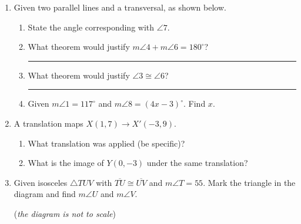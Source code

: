 \documentclass[12pt, twoside]{article}
\begin{document}
\begin{enumerate}
  \item Given two parallel lines and a transversal, as shown below.
  \begin{center}
  \end{center}
  \begin{enumerate}
    \item State the angle corresponding with $\angle 7$. \vspace{0.5cm}
    \item What theorem would justify $m\angle 4 + m\angle 6 =180^\circ$? \rule{5cm}{0.15mm} \vspace{0.5cm}
    \item What theorem would justify $\angle 3 \cong \angle 6$? \rule{7cm}{0.15mm} \vspace{0.5cm}
    \item Given $m\angle 1 = 117^\circ$ and $m\angle 8 = (4x-3)^\circ$. Find $x$. \vspace{3.5cm}
  \end{enumerate}

\newpage
  \item A translation maps $X(1,7) \rightarrow X'(-3,9)$. 
  \begin{enumerate}
    \item What translation was applied (be specific)?  \vspace{2cm}
    \item What is the image of $Y(0,-3)$ under the same translation?
    \end{enumerate} \vspace{2cm}
  
  \item Given isosceles $\triangle TUV$ with $\overline{TU} \cong \overline{UV}$ and $m\angle T = 55$. Mark the triangle in the diagram and find $m\angle U$ and $m\angle V$.
  \begin{flushright}
    (\emph{the diagram is not to scale})\\
  \end{flushright}


\end{enumerate}
\end{document}

